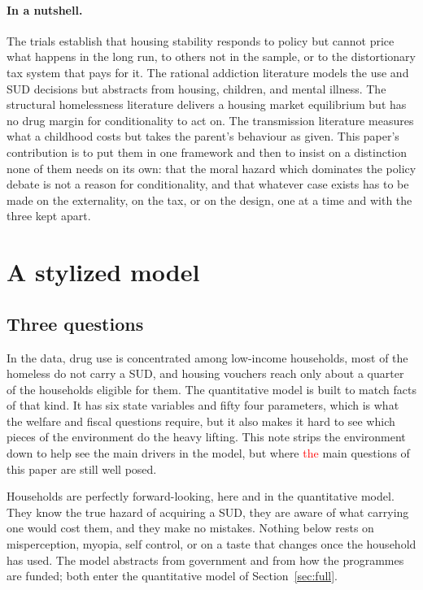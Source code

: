 \documentclass[10pt]{article}
\begin{document}
\paragraph{In a nutshell.} The trials establish that housing stability responds to
policy but cannot price what happens in the long run, to others not in the sample,
or to the distortionary tax system that pays for it. The rational
addiction literature models the use and SUD decisions but abstracts from housing,
children, and mental illness. The structural homelessness literature delivers a housing market
equilibrium but has no drug margin for conditionality to act on. The transmission
literature measures what a childhood costs but takes the parent's behaviour as
given. This paper's contribution is to put them in one framework and then to insist
on a distinction none of them needs on its own: that the moral hazard which
dominates the policy debate is not a reason for conditionality, and that whatever
case exists has to be made on the externality, on the tax, or on the design, one at
a time and with the three kept apart.


\section{A stylized model}\label{sec:stylized}

\subsection{Three questions}\label{sec:what}

In the data, drug use is concentrated among low-income households, most of the
homeless do not carry a SUD, and housing vouchers
reach only about a quarter of the households eligible for them. The quantitative
model is built to match facts of that kind. It has six state variables and
fifty four parameters, which is what the welfare and fiscal questions
require,
but it also makes it hard to see which pieces of the environment do the
heavy lifting. This note strips the environment down to help see the
main drivers in the model, but where \textcolor{red}{the} main questions of this paper are still well
posed.

Households are perfectly forward-looking, here and in the quantitative model.
They know the true hazard of acquiring a SUD, they are aware of what carrying one would
cost them, and they make no mistakes. Nothing below rests on misperception, myopia, self control, or on a taste that changes once the household has used. The model abstracts from government and from how the programmes are funded; both enter the quantitative model of Section~\ref{sec:full}.
\end{document}
